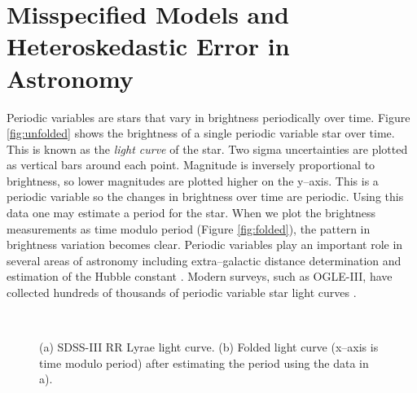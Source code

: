 \documentclass[ejs,ps,preprint]{imsart}
\numberwithin{equation}{section}
\theoremstyle{plain}
\begin{document}
\section{Misspecified Models and Heteroskedastic Error in Astronomy}
\label{sec:astro}

Periodic variables are stars that vary in brightness periodically over time. Figure \ref{fig:unfolded} shows the brightness of a single periodic variable star over time. This is known as the \textit{light curve} of the star. Two sigma uncertainties are plotted as vertical bars around each point. Magnitude is inversely proportional to brightness, so lower magnitudes are plotted higher on the y--axis. This is a periodic variable so the changes in brightness over time are periodic. Using this data one may estimate a period for the star. When we plot the brightness measurements as time modulo period (Figure \ref{fig:folded}), the pattern in brightness variation becomes clear. Periodic variables play an important role in several areas of astronomy including extra--galactic distance determination and estimation of the Hubble constant \cite{shappee2011new,riess20113}. Modern surveys, such as OGLE-III, have collected hundreds of thousands of periodic variable star light curves \cite{udalski2008optical}.

\begin{figure}[t]
\centering
  \\ 
 \caption{(a) SDSS-III RR Lyrae light curve. (b) Folded light curve (x--axis is time modulo period) after estimating the period using the data in a).}
\end{figure}
\end{document}
